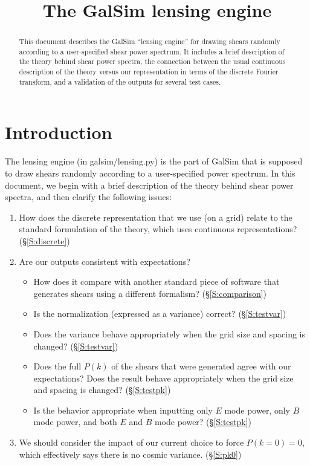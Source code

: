 \documentclass[preprint]{aastex}
\begin{document}
\title{The GalSim lensing engine}

\begin{abstract}
This document describes the GalSim ``lensing engine'' for drawing
shears randomly according to a user-specified shear power spectrum.
It includes a brief description of the theory behind shear power
spectra, the connection between the usual continuous description of
the theory versus our representation in terms of the discrete Fourier
transform, and a validation of the outputs for several test cases.
\end{abstract}

\tableofcontents

\section{Introduction}

The lensing engine (in galsim/lensing.py) is the part of GalSim that
is supposed to draw shears randomly according to a user-specified
power spectrum.  In this document, we begin with a brief description
of the theory behind shear power spectra, and then clarify the following
issues:
\begin{enumerate}
\item How does the discrete representation that we use (on a grid)
  relate to the standard formulation of the theory, which uses
  continuous representations?  (\S\ref{S:discrete})
\item Are our outputs consistent with expectations?
\begin{itemize}
\item How does it compare with another standard piece of software that
  generates shears using a different formalism? (\S\ref{S:comparison})
\item Is the normalization (expressed as a variance) correct? (\S\ref{S:testvar})
\item Does the variance behave appropriately when the grid size and
  spacing is changed? (\S\ref{S:testvar})
\item Does the full $P(k)$ of the shears that were generated agree
  with our expectations?  Does the result behave appropriately when
  the grid size and spacing is changed? (\S\ref{S:testpk})
\item Is the behavior appropriate when inputting only $E$ mode power,
  only $B$ mode power, and both $E$ and $B$ mode power? (\S\ref{S:testpk})
\end{itemize}
\item We should consider the impact of our current choice to force
  $P(k=0)=0$, which effectively says there is no cosmic variance. (\S\ref{S:pk0})
\end{enumerate}
\end{document}
